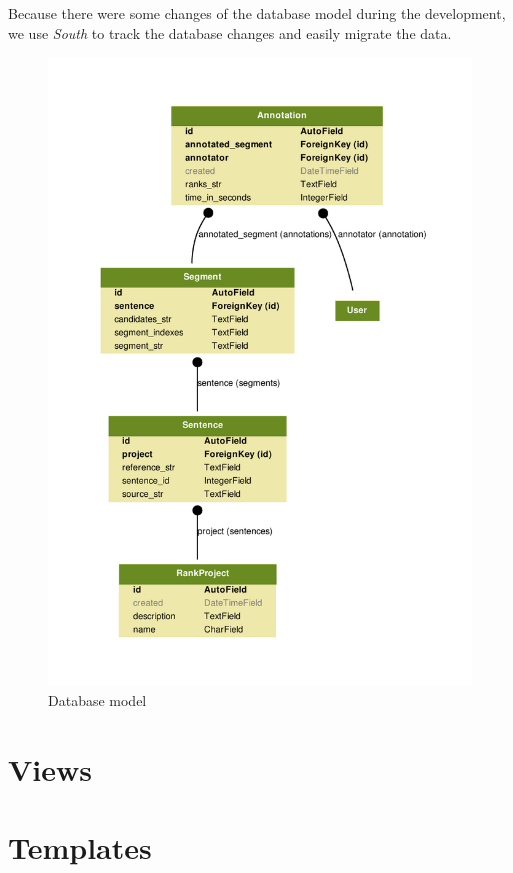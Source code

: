 Because there were some changes of the database model during the development,
we use \textit{South} to track the database changes and easily migrate the
data.

\begin{figure}
    \begin{center}
        \includegraphics[width=12cm]{img/model.pdf}
    \end{center}

    \caption{Database model}
    \label{model}
\end{figure}

\section{Views}

\section{Templates}





